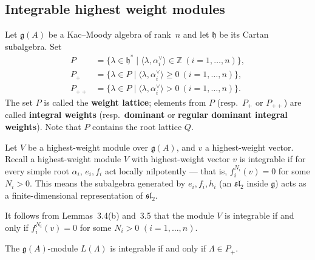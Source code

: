 \documentclass[12pt]{article}
\begin{document}
\subsection{Integrable highest weight modules}
Let $\mathfrak{g}(A)$ be a Kac--Moody algebra of rank~$n$ and let
$\mathfrak{h}$ be its Cartan subalgebra. Set
\[
    \begin{aligned}
        P      & = \{\lambda \in \mathfrak{h}^* \mid \langle \lambda, \alpha_i^\vee \rangle \in \mathbb{Z}
        \ (i=1,\dots,n)\},                                                                                 \\
        P_+    & = \{\lambda \in P \mid \langle \lambda, \alpha_i^\vee \rangle \ge 0
        \ (i=1,\dots,n)\},                                                                                 \\
        P_{++} & = \{\lambda \in P \mid \langle \lambda, \alpha_i^\vee \rangle > 0
        \ (i=1,\dots,n)\}.
    \end{aligned}
\]
The set $P$ is called the \textbf{weight lattice};
elements from $P$ (resp.\ $P_+$ or $P_{++}$) are called
\textbf{integral weights} (resp.\ \textbf{dominant} or
\textbf{regular dominant integral weights}).
Note that $P$ contains the root lattice $Q$.

Let $V$ be a highest-weight module over $\mathfrak{g}(A)$,
and $v$ a highest-weight vector. Recall a highest-weight module $V$ with highest-weight vector $v$ is integrable if for every simple root $\alpha_i$, $e_i, f_i$ act locally nilpotently — that is, $f_i^{N_i}(v)=0$ for some $N_i>0$. This means the subalgebra generated by $e_i, f_i, h_i$ (an $\mathfrak{sl}_2$ inside $\mathfrak{g}$) acts as a finite-dimensional representation of $\mathfrak{sl}_2$.


It follows from Lemmas~3.4(b) and~3.5 that the module $V$ is
integrable if and only if $f_i^{N_i}(v) = 0$ for some $N_i > 0$
$(i=1,\dots,n)$.

\begin{lemma}
    The $\mathfrak{g}(A)$-module $L(\Lambda)$ is integrable if and only if $\Lambda \in P_+$.
\end{lemma}
\end{document}
